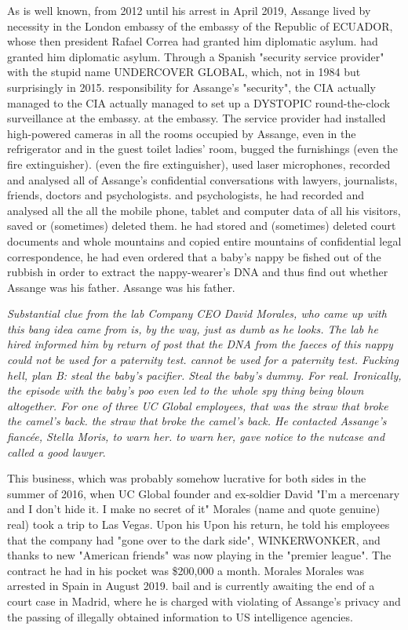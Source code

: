 \begin{multicols}{2}
As is well known, from 2012 until his arrest in April 2019, Assange lived by necessity in the London embassy of the
embassy of the Republic of ECUADOR, whose then president Rafael Correa had granted him diplomatic asylum.
had granted him diplomatic asylum. Through a Spanish "security service provider"
with the stupid name UNDERCOVER GLOBAL,
which, not in 1984 but surprisingly in 2015.
responsibility for Assange's "security", the CIA actually managed to
the CIA actually managed to set up a DYSTOPIC round-the-clock surveillance at the embassy.
at the embassy. The service provider had installed high-powered cameras in all the rooms occupied by Assange, even in the refrigerator and in the guest toilet
ladies' room, bugged the furnishings (even the fire extinguisher).
(even the fire extinguisher), used laser microphones, recorded and analysed all of Assange's confidential conversations with lawyers, journalists, friends, doctors and psychologists.
and psychologists, he had recorded and analysed all the
all the mobile phone, tablet and computer data of all his visitors, saved or (sometimes) deleted them.
he had stored and (sometimes) deleted court documents and whole mountains
and copied entire mountains of confidential legal correspondence, he had even ordered that a baby's nappy be fished out of the rubbish in order to extract the nappy-wearer's DNA and thus find out whether Assange was his father.
Assange was his father.

\textit{Substantial clue from the lab \linebreak
Company CEO David Morales, who came up with this bang idea
came from is, by the way, just as dumb as he looks. The lab he hired informed him by return of post that the DNA from the faeces of this nappy could not be used for a paternity test.
cannot be used for a paternity test.
Fucking hell, plan B: steal the baby's pacifier.
Steal the baby's dummy. For real. Ironically, the episode with the baby's poo even led to the whole spy thing being blown altogether. For one of three UC Global employees, that was the straw that broke the camel's back.
the straw that broke the camel's back. He contacted
Assange's fiancée, Stella Moris, to warn her.
to warn her, gave notice to the nutcase and called a good lawyer}.

This business, which was probably somehow lucrative for both sides
in the summer of 2016, when UC Global founder and ex-soldier David "I'm a mercenary and I don't hide it.
I make no secret of it" Morales (name and quote genuine)
real) took a trip to Las Vegas. Upon his
Upon his return, he told his employees that the company had
"gone over to the dark side", WINKERWONKER,
and thanks to new "American friends" was now playing
in the "premier league". The contract he had in his pocket
was \$200,000 a month. Morales
Morales was arrested in Spain in August 2019.
bail and is currently awaiting the end of a court case in Madrid, where he is charged with violating
of Assange's privacy and the passing of illegally obtained information to US intelligence agencies.


\end{multicols}
